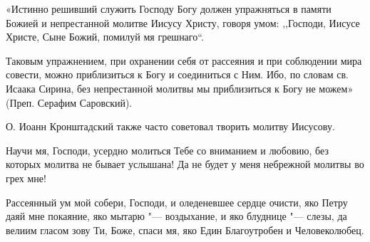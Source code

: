 «Истинно решивший служить Господу Богу должен упражняться в памяти Божией и непрестанной молитве Иисусу Христу, говоря умом: ,,Господи, Иисусе Христе, Сыне Божий, помилуй мя грешнаго``. 

Таковым упражнением, при охранении себя от рассеяния и при соблюдении мира совести, можно приблизиться к Богу и соединиться с Ним. Ибо, по словам св. Исаака Сирина, без непрестанной молитвы мы приблизиться к Богу не можем» (Преп. Серафим Саровский). 

О. Иоанн Кронштадский также часто советовал творить молитву Иисусову.


\longpage[2]{}\mychapterending[1]

 





Научи мя, Господи, усердно молиться Тебе со вниманием и любовию, без которых молитва не бывает услышана! Да не будет у меня небрежной молитвы во грех мне!

 


\mychapterending

 





Рассеянный ум мой собери, Господи, и оледеневшее сердце очисти, яко Петру даяй мне покаяние, яко мытарю "--- воздыхание, и яко блуднице "--- слезы, да велиим гласом зову Ти, Боже, спаси мя, яко Един Благоутробен и Человеколюбец. 




\mychapterending

 





